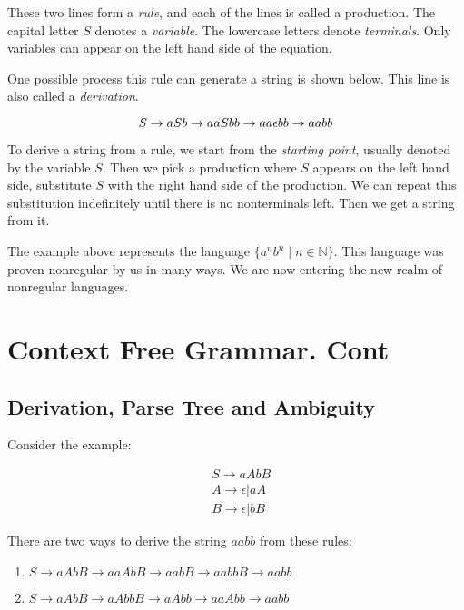 \documentclass[11pt]{article}
\begin{document}
These two lines form a \emph{rule}, and each of the lines is called a
production. The capital letter $S$ denotes a \emph{variable}. The lowercase
letters denote \emph{terminals}. Only variables can appear on the left hand
side of the equation.

One possible process this rule can generate a string is shown below. This
line is also called a \emph{derivation}.

\begin{equation*}
\centering
S \rightarrow aSb \rightarrow aaSbb \rightarrow aa \epsilon bb \rightarrow aabb
\end{equation*}

To derive a string from a rule, we start from the \emph{starting point},
usually denoted by the variable $S$. Then we pick a production where $S$ appears
on the left hand side, substitute $S$ with the right hand side of the
production. We can repeat this substitution indefinitely until there is no
nonterminals left. Then we get a string from it.

The example above represents the language $\{a^nb^n \mid n \in \mathbb{N}\}$.
This language was proven nonregular by us in many ways. We are now entering
the new realm of nonregular languages.

\section{Context Free Grammar. Cont}

\subsection{Derivation, Parse Tree and Ambiguity}

Consider the example:

\begin{align*}
&S \rightarrow aAbB \\
&A \rightarrow \epsilon | aA \\
&B \rightarrow \epsilon | bB
\end{align*}

There are two ways to derive the string $aabb$ from these rules:

\begin{enumerate}
\item $S \rightarrow aAbB \rightarrow aaAbB \rightarrow aabB \rightarrow aabbB \rightarrow aabb$
\item $S \rightarrow aAbB \rightarrow aAbbB \rightarrow aAbb \rightarrow aaAbb \rightarrow aabb$
\end{enumerate}
\end{document}
